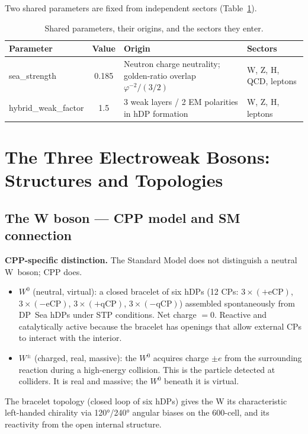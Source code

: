 \documentclass[11pt,letterpaper]{article}
\newcommand{\phig}{\varphi}   %
\begin{document}
Two shared parameters are fixed from independent sectors
(Table~\ref{tab:params}).

\begin{table}[H]
\centering
\caption{Shared parameters, their origins, and the sectors they enter.}
\label{tab:params}
\begin{tabular}{@{}lcll@{}}
\toprule
Parameter & Value & Origin & Sectors \\
\midrule
sea\_strength & 0.185 & Neutron charge neutrality; golden-ratio
  overlap $\phig^{-2}/(3/2)$ & W, Z, H, QCD, leptons \\
hybrid\_weak\_factor & 1.5 & 3 weak layers / 2 EM polarities in hDP
  formation & W, Z, H, leptons \\
\bottomrule
\end{tabular}
\end{table}

\section{The Three Electroweak Bosons: Structures and Topologies}

\subsection{The W boson --- CPP model and SM connection}

\textbf{CPP-specific distinction.}  The Standard Model does not
distinguish a neutral W~boson; CPP does.

\begin{itemize}
\item $W^0$ (neutral, virtual): a closed bracelet of six hDPs (12 CPs:
  $3{\times}(+\text{eCP})$, $3{\times}(-\text{eCP})$,
  $3{\times}(+\text{qCP})$, $3{\times}(-\text{qCP})$) assembled
  spontaneously from DP~Sea hDPs under STP conditions.  Net charge
  $= 0$.  Reactive and catalytically active because the bracelet has
  openings that allow external CPs to interact with the interior.
\item $W^\pm$ (charged, real, massive): the $W^0$ acquires charge
  $\pm e$ from the surrounding reaction during a high-energy
  collision.  This is the particle detected at colliders.  It is
  real and massive; the $W^0$ beneath it is virtual.
\end{itemize}

The bracelet topology (closed loop of six hDPs) gives the W its
characteristic left-handed chirality via 120°/240° angular biases on
the 600-cell, and its reactivity from the open internal structure.
\end{document}
